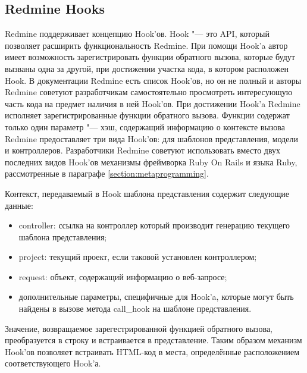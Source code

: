 \subsection{Redmine Hooks}
\label{section:redmine_hooks}
Redmine поддерживает концепцию Hook'ов. Hook "--- это API, который позволяет
расширить функциональность Redmine. При помощи Hook'a автор имеет возможность
зарегистрировать функции обратного вызова, которые будут вызваны одна за
другой, при достижении участка кода, в котором расположен Hook. В документации
Redmine есть список Hook'ов, но он не полный и авторы Redmine советуют
разработчикам самостоятельно просмотреть интересующую часть кода на предмет
наличия в ней Hook'ов. При достижении Hook'a Redmine исполняет
зарегистрированные функции обратного вызова. Функции содержат только один
параметр "--- хэш, содержащий информацию о контексте вызова Redmine
предоставляет три вида Hook'ов: для шаблонов представления, модели и
контроллеров. Разработчики Redmine советуют использовать вместо двух последних
видов Hook'ов механизмы фреймворка Ruby On Rails и языка Ruby, рассмотренные
в параграфе \ref{section:metaprogramming}. 

Контекст, передаваемый в Hook шаблона представления содержит следующие данные:
\begin{itemize}
  \item controller: ссылка на контроллер который производит генерацию
  текущего шаблона представления;
  \item project: текущий проект, если таковой установлен контроллером;
  \item request: объект, содержащий информацию о веб-запросе;
  \item дополнительные параметры, специфичные для Hook'a, которые могут
  быть найдены в вызове метода call\_hook на шаблоне представления.
\end{itemize}
Значение, возвращаемое зарегестрированной функцией обратного вызова,
преобразуется в строку и встраивается в представление. Таким образом механизм
Hook'ов позволяет встраивать HTML-код в места, определённые расположением
соответствующего Hook'а.

